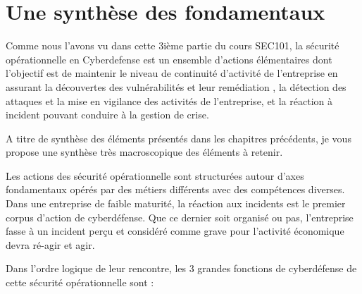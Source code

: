 

\section{Une synthèse des  fondamentaux}
Comme nous l'avons vu dans cette 3ième partie du cours SEC101,  la sécurité opérationnelle en Cyberdefense est un ensemble d'actions  élémentaires dont l'objectif est  de maintenir le niveau de continuité d'activité de l'entreprise en assurant la découvertes des vulnérabilités et leur remédiation , la détection des attaques et la mise en vigilance des activités de l'entreprise, et la réaction à incident pouvant conduire à la gestion de crise.

A titre de synthèse des éléments présentés dans les chapitres précédents, je vous propose une synthèse très macroscopique des éléments à retenir.

Les actions des sécurité opérationnelle sont structurées autour d'axes  fondamentaux opérés par des métiers différents avec des compétences diverses. Dans une entreprise de faible maturité, la réaction aux incidents est le premier corpus d'action de cyberdéfense. Que ce dernier soit organisé ou pas, l'entreprise fasse à un incident perçu et considéré comme grave pour l'activité économique devra ré-agir et agir.

Dans l'ordre logique de leur rencontre, les 3 grandes fonctions de cyberdéfense de cette sécurité opérationnelle sont  :

